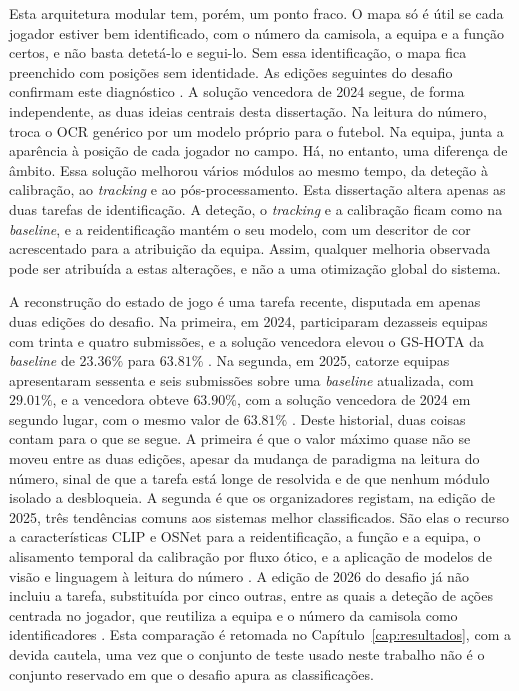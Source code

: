 Esta arquitetura modular tem, porém, um ponto fraco. O mapa só é útil se cada jogador estiver bem identificado, com o número da camisola, a equipa e a função certos, e não basta detetá-lo e segui-lo. Sem essa identificação, o mapa fica preenchido com posições sem identidade. As edições seguintes do desafio confirmam este diagnóstico \citep{cioppa2024soccernet, giancola2025soccernet}. A solução vencedora de 2024 \citep{golovkin2025minimap} segue, de forma independente, as duas ideias centrais desta dissertação. Na leitura do número, troca o OCR genérico por um modelo próprio para o futebol. Na equipa, junta a aparência à posição de cada jogador no campo. Há, no entanto, uma diferença de âmbito. Essa solução melhorou vários módulos ao mesmo tempo, da deteção à calibração, ao \emph{tracking} e ao pós-processamento. Esta dissertação altera apenas as duas tarefas de identificação. A deteção, o \emph{tracking} e a calibração ficam como na \emph{baseline}, e a reidentificação mantém o seu modelo, com um descritor de cor acrescentado para a atribuição da equipa. Assim, qualquer melhoria observada pode ser atribuída a estas alterações, e não a uma otimização global do sistema.

A reconstrução do estado de jogo é uma tarefa recente, disputada em apenas duas edições do desafio. Na primeira, em 2024, participaram dezasseis equipas com trinta e quatro submissões, e a solução vencedora elevou o GS-HOTA da \emph{baseline} de $23.36\%$ para $63.81\%$ \citep{cioppa2024soccernet}. Na segunda, em 2025, catorze equipas apresentaram sessenta e seis submissões sobre uma \emph{baseline} atualizada, com $29.01\%$, e a vencedora obteve $63.90\%$, com a solução vencedora de 2024 em segundo lugar, com o mesmo valor de $63.81\%$ \citep{giancola2025soccernet}. Deste historial, duas coisas contam para o que se segue. A primeira é que o valor máximo quase não se moveu entre as duas edições, apesar da mudança de paradigma na leitura do número, sinal de que a tarefa está longe de resolvida e de que nenhum módulo isolado a desbloqueia. A segunda é que os organizadores registam, na edição de 2025, três tendências comuns aos sistemas melhor classificados. São elas o recurso a características CLIP e OSNet para a reidentificação, a função e a equipa, o alisamento temporal da calibração por fluxo ótico, e a aplicação de modelos de visão e linguagem à leitura do número \citep{giancola2025soccernet}. A edição de 2026 do desafio já não incluiu a tarefa, substituída por cinco outras, entre as quais a deteção de ações centrada no jogador, que reutiliza a equipa e o número da camisola como identificadores \citep{cioppa2026soccernet}. Esta comparação é retomada no Capítulo~\ref{cap:resultados}, com a devida cautela, uma vez que o conjunto de teste usado neste trabalho não é o conjunto reservado em que o desafio apura as classificações.

